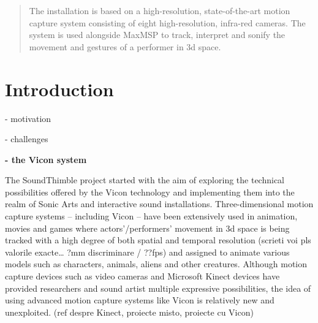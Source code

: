 \documentclass{nime-alternate}
\begin{document}
\maketitle
\begin{abstract}
	
	
 The installation is based on a high-resolution, state-of-the-art motion capture system consisting of eight high-resolution, infra-red cameras. The system is used alongside MaxMSP to track, interpret and sonify the movement and gestures of a performer in 3d space.
\end{abstract}






\section{Introduction}

- motivation

- challenges

\textbf{- the Vicon system}\\ \par

The SoundThimble project started with the aim of exploring the technical possibilities offered by the Vicon technology and implementing them into the realm of Sonic Arts and interactive sound installations. Three-dimensional motion capture systems – including Vicon – have been extensively used in animation, movies and games where actors’/performers’ movement in 3d space is being tracked with a high degree of both spatial and temporal resolution (scrieti voi pls valorile exacte… ?mm discriminare / ??fps) and assigned to animate various models such as characters, animals, aliens and other creatures. Although motion capture devices such as video cameras and Microsoft Kinect  devices have provided researchers and sound artist multiple expressive possibilities, the idea of using advanced motion capture systems like Vicon is relatively new and unexploited. (ref despre Kinect, proiecte misto, proiecte cu Vicon) 
\end{document}
